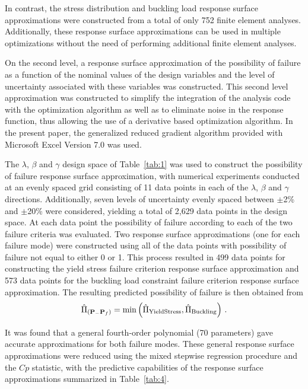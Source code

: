 \documentclass[stropt]{svjour}
\def\p{\mathbf{P}}%
\begin{document}
\bigskip
In contrast, the stress distribution and buckling load response surface
approximations were constructed from a total of only 752 finite element
analyses.
Additionally, these response surface approximations can be used in multiple
optimizations without the need of performing additional finite element
analyses.

On the second level, a response surface approximation of the possibility of
failure as a function of the nominal values of the design variables and the
level of uncertainty associated with these variables was constructed.
This second level approximation was constructed to simplify the integration of
the analysis code with the optimization algorithm as well as to eliminate
noise in the response function, thus allowing the use of a derivative based
optimization algorithm.
In the present paper, the generalized reduced gradient algorithm provided
with Microsoft Excel Version 7.0 was used.

The $\lambda$, $\beta$ and $\gamma$ design space of Table~\ref{tab:1} was used
to construct the possibility of failure response surface approximation, with
numerical experiments conducted at an evenly spaced grid consisting of 11 data
points in each of the $\lambda$, $\beta$ and $\gamma$ directions.
Additionally, seven levels of uncertainty evenly spaced between $\pm$2\% and
$\pm$20\% were considered, yielding a total of 2,629 data points in the design
space.
At each data point the possibility of failure according to each of the two
failure criteria was evaluated.
Two response surface approximations (one for each failure mode) were
constructed using all of the data points with possibility of failure not
equal to either 0 or 1.
This process resulted in 499 data points for constructing the yield stress
failure criterion response surface approximation and 573 data points for the
buckling load constraint failure criterion response surface approximation.
The resulting predicted possibility of failure is then obtained from
\begin{equation}
\hat{\Pi}_{(\p_-\p_f)}=\min\left(\hat{\Pi}_{{\rm Yield Stress}},
\hat{\Pi}_{{\rm Buckling}} \right)\, .\label{eq27}
\end{equation}

It was found that a general fourth-order polynomial (70 parameters) gave
accurate approximations for both failure modes.
These general response surface approximations were reduced using the mixed
stepwise regression procedure and the $Cp$ statistic, with the predictive
capabilities of the response surface approximations summarized in
Table~\ref{tab:4}.
\end{document}
